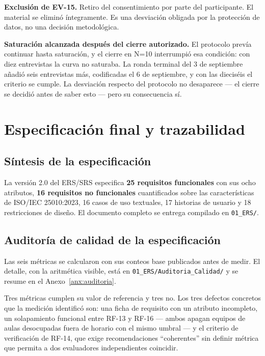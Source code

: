 \documentclass[11pt,a4paper]{article}
\begin{document}
\textbf{Exclusi\'on de EV-15.} Retiro del consentimiento por parte del participante. El
material se elimin\'o \'integramente. Es una desviaci\'on obligada por la protecci\'on de
datos, no una decisi\'on metodol\'ogica.

\textbf{Saturaci\'on alcanzada despu\'es del cierre autorizado.} El protocolo prev\'ia
continuar hasta saturaci\'on, y el cierre en N=10 interrumpi\'o esa condici\'on: con diez
entrevistas la curva no saturaba. La ronda terminal del 3 de septiembre a\~nadi\'o seis
entrevistas m\'as, codificadas el 6 de septiembre, y con las diecis\'eis el criterio se
cumple. La desviaci\'on respecto del protocolo no desaparece --- el cierre se decidi\'o
antes de saber esto --- pero su consecuencia s\'i.

\section{Especificaci\'on final y trazabilidad}

\subsection{S\'intesis de la especificaci\'on}

La versi\'on 2.0 del ERS/SRS especifica \textbf{25 requisitos funcionales} con sus ocho
atributos, \textbf{16 requisitos no funcionales} cuantificados sobre las
caracter\'isticas de ISO/IEC 25010:2023, 16 casos de uso textuales, 17 historias de
usuario y 18 restricciones de dise\~no. El documento completo se entrega compilado en
\texttt{01\_ERS/}.

\subsection{Auditor\'ia de calidad de la especificaci\'on}

Las seis m\'etricas se calcularon con sus conteos base publicados antes de medir. El
detalle, con la aritm\'etica visible, est\'a en
\texttt{01\_ERS/Auditoria\_Calidad/} y se resume en el Anexo~\ref{anx:auditoria}.

Tres m\'etricas cumplen su valor de referencia y tres no. Los tres defectos concretos
que la medici\'on identific\'o son: una ficha de requisito con un atributo incompleto, un
solapamiento funcional entre RF-13 y RF-16 --- ambos apagan equipos de aulas desocupadas
fuera de horario con el mismo umbral --- y el criterio de verificaci\'on de RF-14, que
exige recomendaciones \enquote{coherentes} sin definir m\'etrica que permita a dos
evaluadores independientes coincidir.
\end{document}
